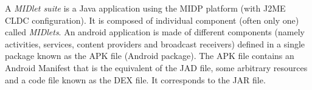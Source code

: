 A \emph{MIDlet suite} is a Java application using the MIDP platform (with J2ME
CLDC configuration). It is composed of individual component (often only one)
called \emph{MIDlets}. An android application is made of different components
(namely activities, services, content providers and broadcast receivers) defined
in a single package known as the APK file (Android package). The APK file
contains an Android Manifest that is the equivalent of the JAD file, some
arbitrary resources and a code file known as the DEX file. It corresponds to the
JAR file.
